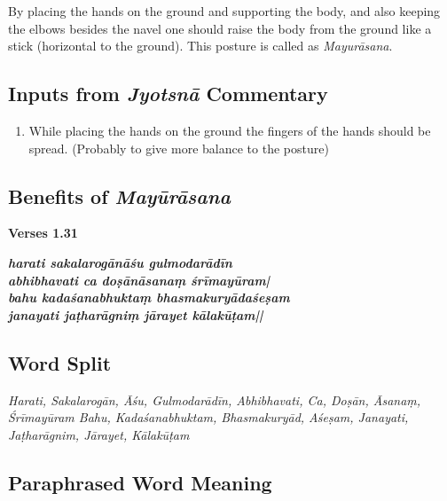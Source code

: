 By placing the hands on the ground and supporting the body, and also keeping the elbows besides the navel one should raise the body from the ground like a stick (horizontal to the ground). This posture is called as \textit{Mayurāsana}.

\subsection*{Inputs from \textit{Jyotsnā} Commentary}

\begin{enumerate}
\item While placing the hands on the ground the fingers of the hands should be spread. (Probably to give more balance to the posture) 
\end{enumerate}

\subsection*{Benefits of \textit{Mayūrāsana}}

\noindent 
\textbf{Verses 1.31}

\begin{shloka}
\textit{\textbf{harati sakalarogānāśu gulmodarādīn}\\
\textbf{abhibhavati ca doṣānāsanaṃ śrīmayūram|}\\
\textbf{bahu kadaśanabhuktaṃ bhasmakuryādaśeṣam}\\
\textbf{janayati jaṭharāgniṃ jārayet kālakūṭam||}}
\end{shloka}

\subsection*{Word Split}

\textit{Harati, Sakalarogān, Āśu, Gulmodarādīn, Abhibhavati, Ca, Doṣān, Āsanaṃ, Śrīmayūram
Bahu, Kadaśanabhuktam, Bhasmakuryād, Aśeṣam, Janayati, Jaṭharāgnim, Jārayet, Kālakūṭam}

\subsection*{Paraphrased Word Meaning}

